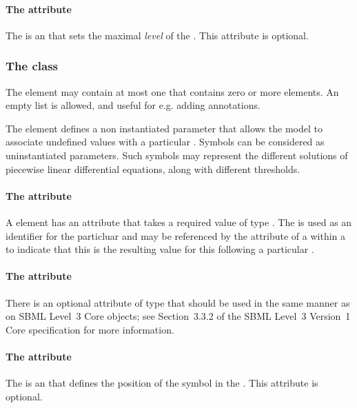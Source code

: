 \paragraph{The  attribute}
The  is an  that sets the maximal \emph{level} of the . This attribute is optional.

\subsubsection{The  class}
The \QualitativeSpecies element may contain at most one \ListOfSymbolicValues that contains zero or more \SymbolicValue elements. An empty list is allowed, and useful for e.g. adding annotations.

The \SymbolicValue element defines a non instantiated parameter that allows the model to associate undefined values with a particular \QualitativeSpecies.
Symbols can be considered as uninstantiated parameters. Such symbols may represent the different solutions of piecewise linear differential equations, along with different thresholds.

\paragraph{The  attribute}
A \SymbolicValue element has an  attribute that takes a required value
of type . The  is used as an identifier for the particluar \SymbolicValue and may be referenced by the  attribute of a \FunctionTerm within a \Transition to indicate that this \SymbolicValue is the resulting value for this \QualitativeSpecies following a particular \Transition.

\paragraph{The  attribute}
There is an optional  attribute of type  that should be used
in the same manner as on SBML Level~3 Core
objects; see Section~3.3.2 of the SBML Level~3 Version~1 Core
specification for more information.


\paragraph{The  attribute}
The  is an  that defines the position of the symbol in the \ListOfSymbolicValues. This attribute is optional. 

